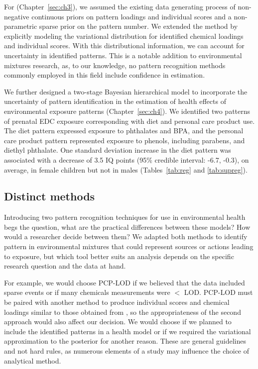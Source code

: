 For \bnmfc (Chapter~\ref{sec:ch3}), we assumed the existing data generating process of non-negative continuous priors on pattern loadings and individual scores and a non-parametric sparse prior on the pattern number. We extended the method by explicitly modeling the variational distribution for identified chemical loadings and individual scores. With this distributional information, we can account for uncertainty in identified patterns. This is a notable addition to environmental mixtures research, as, to our knowledge, no pattern recognition methods commonly employed in this field include confidence in estimation.

We further designed a two-stage Bayesian hierarchical model to incorporate the uncertainty of pattern identification in the estimation of health effects of environmental exposure patterns (Chapter~\ref{sec:ch4}). We identified two patterns of prenatal EDC exposure corresponding with diet and personal care product use. The diet pattern expressed exposure to phthalates and BPA, and the personal care product pattern represented exposure to phenols, including parabens, and diethyl phthalate. One standard deviation increase in the diet pattern was associated with a decrease of 3.5 IQ points (95\% credible interval: -6.7, -0.3), on average, in female children but not in males (Tables~\ref{tab:reg} and \ref{tab:supreg}).

\subsection{Distinct methods}\label{sec:difference}
Introducing two pattern recognition techniques for use in environmental health begs the question, what are the practical differences between these models? How would a researcher decide between them? We adapted both methods to identify pattern in environmental mixtures that could represent sources or actions leading to exposure, but which tool better suits an analysis depends on the specific research question and the data at hand.

For example, we would choose PCP-LOD if we believed that the data included sparse events or if many chemicals measurements were $<$ LOD. PCP-LOD must be paired with another method to produce individual scores and chemical loadings similar to those obtained from \bnmfc, so the appropriateness of the second approach would also affect our decision. We would choose \bnmf if we planned to include the identified patterns in a health model or if we required the variational approximation to the posterior for another reason. These are general guidelines and not hard rules, as numerous elements of a study may influence the choice of analytical method.

